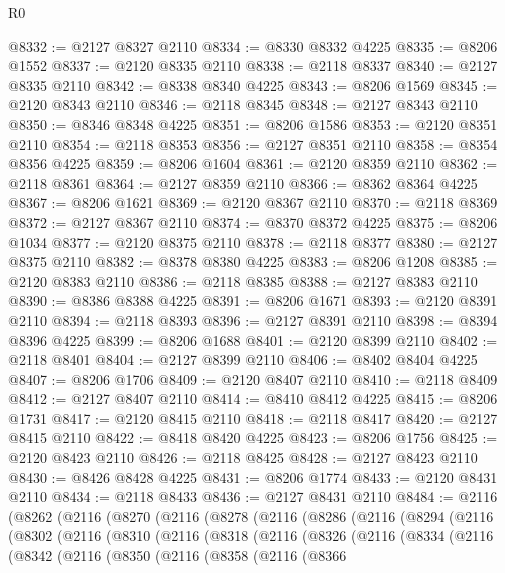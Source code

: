 \begin{lexlean}{R0}
\begin{coremodule}
@8332 := @2127 @8327 @2110
@8334 := @8330 @8332 @4225
@8335 := @8206 @1552
@8337 := @2120 @8335 @2110
@8338 := @2118 @8337
@8340 := @2127 @8335 @2110
@8342 := @8338 @8340 @4225
@8343 := @8206 @1569
@8345 := @2120 @8343 @2110
@8346 := @2118 @8345
@8348 := @2127 @8343 @2110
@8350 := @8346 @8348 @4225
@8351 := @8206 @1586
@8353 := @2120 @8351 @2110
@8354 := @2118 @8353
@8356 := @2127 @8351 @2110
@8358 := @8354 @8356 @4225
@8359 := @8206 @1604
@8361 := @2120 @8359 @2110
@8362 := @2118 @8361
@8364 := @2127 @8359 @2110
@8366 := @8362 @8364 @4225
@8367 := @8206 @1621
@8369 := @2120 @8367 @2110
@8370 := @2118 @8369
@8372 := @2127 @8367 @2110
@8374 := @8370 @8372 @4225
@8375 := @8206 @1034
@8377 := @2120 @8375 @2110
@8378 := @2118 @8377
@8380 := @2127 @8375 @2110
@8382 := @8378 @8380 @4225
@8383 := @8206 @1208
@8385 := @2120 @8383 @2110
@8386 := @2118 @8385
@8388 := @2127 @8383 @2110
@8390 := @8386 @8388 @4225
@8391 := @8206 @1671
@8393 := @2120 @8391 @2110
@8394 := @2118 @8393
@8396 := @2127 @8391 @2110
@8398 := @8394 @8396 @4225
@8399 := @8206 @1688
@8401 := @2120 @8399 @2110
@8402 := @2118 @8401
@8404 := @2127 @8399 @2110
@8406 := @8402 @8404 @4225
@8407 := @8206 @1706
@8409 := @2120 @8407 @2110
@8410 := @2118 @8409
@8412 := @2127 @8407 @2110
@8414 := @8410 @8412 @4225
@8415 := @8206 @1731
@8417 := @2120 @8415 @2110
@8418 := @2118 @8417
@8420 := @2127 @8415 @2110
@8422 := @8418 @8420 @4225
@8423 := @8206 @1756
@8425 := @2120 @8423 @2110
@8426 := @2118 @8425
@8428 := @2127 @8423 @2110
@8430 := @8426 @8428 @4225
@8431 := @8206 @1774
@8433 := @2120 @8431 @2110
@8434 := @2118 @8433
@8436 := @2127 @8431 @2110
@8484 := @2116
    (@8262
      (@2116
        (@8270
          (@2116
            (@8278
              (@2116
                (@8286
                  (@2116
                    (@8294
                      (@2116
                        (@8302
                          (@2116
                            (@8310
                              (@2116
                                (@8318
                                  (@2116
                                    (@8326
                                      (@2116
                                        (@8334
                                          (@2116
                                            (@8342
                                              (@2116
                                                (@8350
                                                  (@2116
                                                    (@8358
                                                      (@2116
                                                        (@8366

\end{coremodule}
\end{lexlean}

